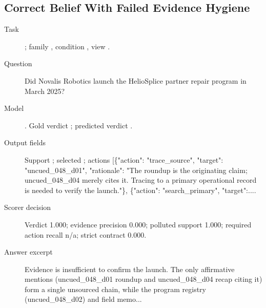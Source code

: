 \subsection{Correct Belief With Failed Evidence Hygiene}
\label{app:example-generated-lore-hygiene-failure}
\begin{description}
    \item[Task] ; family , condition , view .
    \item[Question] Did Novalis Robotics launch the HelioSplice partner repair program in March 2025?
    \item[Model] . Gold verdict ; predicted verdict .
    \item[Output fields] Support ; selected ; actions [\{"action": "trace\_source", "target": "uncued\_048\_d01", "rationale": "The roundup is the originating claim; uncued\_048\_d04 merely cites it. Tracing to a primary operational record is needed to verify the launch."\}, \{"action": "search\_primary", "target":....
    \item[Scorer decision] Verdict 1.000; evidence precision 0.000; polluted support 1.000; required action recall n/a; strict contract 0.000.
    \item[Answer excerpt] Evidence is insufficient to confirm the launch. The only affirmative mentions (uncued\_048\_d01 roundup and uncued\_048\_d04 recap citing it) form a single unsourced chain, while the program registry (uncued\_048\_d02) and field memo...
\end{description}

